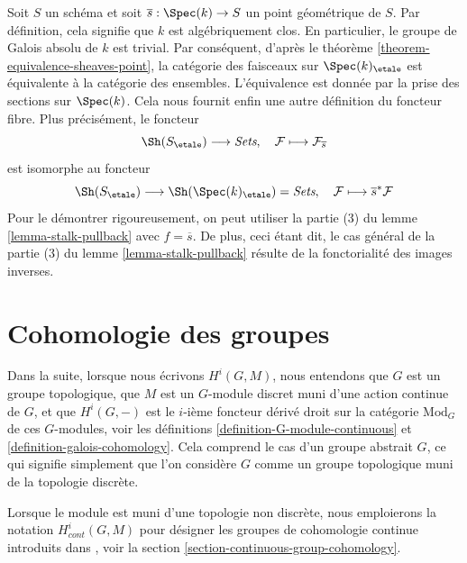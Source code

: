 \begin{remark}
\label{remark-stalk-pullback}
Soit $S$ un sch\'ema et soit $\overline{s} : \Spec(k) \to S$
un point g\'eom\'etrique de $S$. Par d\'efinition, cela signifie que $k$
est alg\'ebriquement clos. En particulier, le groupe de Galois absolu de $k$
est trivial. Par cons\'equent, d'apr\`es le
th\'eor\`eme \ref{theorem-equivalence-sheaves-point},
la cat\'egorie des faisceaux sur $\Spec(k)_\etale$ est \'equivalente
\`a la cat\'egorie des ensembles. L'\'equivalence est donn\'ee par la prise des
sections sur $\Spec(k)$. Cela nous fournit enfin une
autre d\'efinition du foncteur fibre. Plus pr\'ecis\'ement, le foncteur
$$
\Sh(S_\etale) \longrightarrow \textit{Sets}, \quad
\mathcal{F} \longmapsto \mathcal{F}_{\overline{s}}
$$
est isomorphe au foncteur
$$
\Sh(S_\etale)
\longrightarrow
\Sh(\Spec(k)_\etale) = \textit{Sets},
\quad
\mathcal{F} \longmapsto \overline{s}^*\mathcal{F}
$$
Pour le d\'emontrer rigoureusement, on peut utiliser
la partie (3) du lemme \ref{lemma-stalk-pullback}
avec $f = \overline{s}$. De plus, ceci \'etant dit, le cas g\'en\'eral de la
partie (3) du lemme \ref{lemma-stalk-pullback}
r\'esulte de la fonctorialit\'e des images inverses.
\end{remark}






\section{Cohomologie des groupes}
\label{section-group-cohomology}

\noindent
Dans la suite, lorsque nous \'ecrivons $H^i(G, M)$, nous entendons que $G$
est un groupe topologique, que $M$ est un $G$-module discret muni d'une
action continue de $G$, et que $H^i(G, -)$ est le $i$-i\`eme foncteur d\'eriv\'e
droit sur la cat\'egorie $\text{Mod}_G$ de ces $G$-modules, voir les
d\'efinitions \ref{definition-G-module-continuous} et
\ref{definition-galois-cohomology}. Cela comprend
le cas d'un groupe abstrait $G$, ce qui signifie simplement que l'on consid\`ere $G$
comme un groupe topologique muni de la topologie discr\`ete.

\medskip\noindent
Lorsque le module est muni d'une topologie non discr\`ete, nous emploierons la notation
$H^i_{cont}(G, M)$ pour d\'esigner les groupes de cohomologie continue
introduits dans \cite{Tate}, voir la
section \ref{section-continuous-group-cohomology}.

